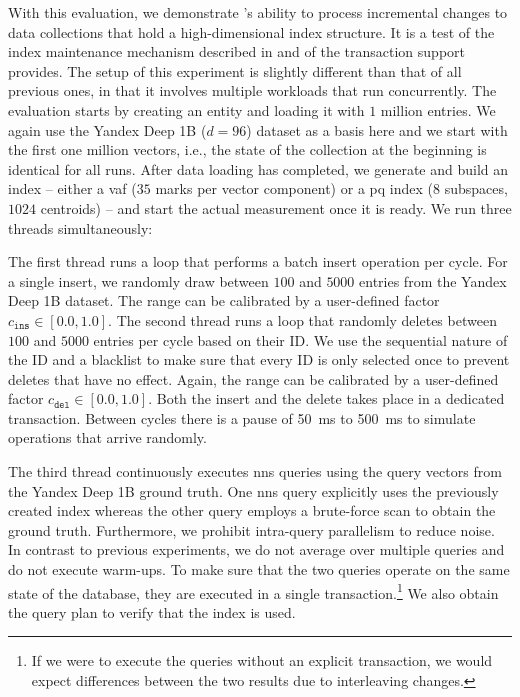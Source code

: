 With this evaluation, we demonstrate \cottontail{}'s ability to process incremental changes to data collections that hold a high-dimensional index structure. It is a test of the index maintenance mechanism described in  and of the transaction support \cottontail{} provides. The setup of this experiment is slightly different than that of all previous ones, in that it involves multiple workloads that run concurrently. The evaluation starts by creating an entity and loading it with $1$ million entries. We again use the Yandex Deep 1B ($d = 96$) dataset as a basis here and we start with the first one million vectors, i.e., the state of the collection at the beginning is identical for all runs. After data loading has completed, we generate and build an index -- either a \acrshort{vaf} ($35$ marks per vector component) or a \acrshort{pq} index ($8$ subspaces, $1024$ centroids) -- and start the actual measurement once it is ready. We run three threads simultaneously: 

The first thread runs a loop that performs a batch insert operation per cycle. For a single insert, we randomly draw between $100$ and $5000$ entries from the Yandex Deep 1B dataset. The range can be calibrated by a user-defined factor $c_{\texttt{ins}} \in [0.0, 1.0]$. The second thread runs a loop that randomly deletes between $100$ and $5000$ entries per cycle based on their ID. We use the sequential nature of the ID and a blacklist to make sure that every ID is only selected once to prevent deletes that have no effect. Again, the range can be calibrated by a user-defined factor $c_{\texttt{del}} \in [0.0, 1.0]$. Both the insert and the delete takes place in a dedicated transaction. Between cycles there is a pause of \SI{50}{\milli\second} to \SI{500}{\milli\second} to simulate operations that arrive randomly.

The third thread continuously executes \acrshort{nns} queries using the query vectors from the Yandex Deep 1B ground truth. One \acrshort{nns} query explicitly uses the previously created index whereas the other query employs a brute-force scan to obtain the ground truth. Furthermore, we prohibit intra-query parallelism to reduce noise. In contrast to previous experiments, we do not average over multiple queries and do not execute warm-ups. To make sure that the two queries operate on the same state of the database, they are executed in a single transaction.\footnote{If we were to execute the queries without an explicit transaction, we would expect differences between the two results due to interleaving changes.} We also obtain the query plan to verify that the index is used. 

